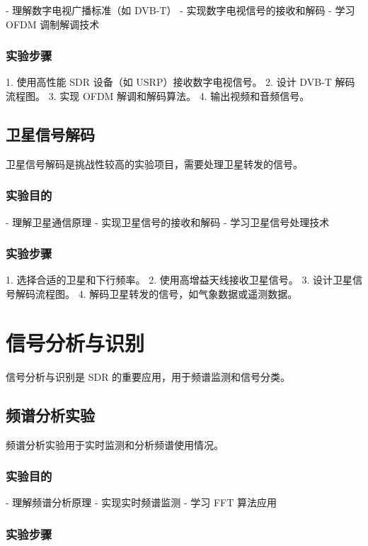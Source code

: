 \documentclass[UTF8]{ctexbook}
\begin{document}
- 理解数字电视广播标准（如 DVB-T）
- 实现数字电视信号的接收和解码
- 学习 OFDM 调制解调技术

\subsubsection{实验步骤}

1. 使用高性能 SDR 设备（如 USRP）接收数字电视信号。
2. 设计 DVB-T 解码流程图。
3. 实现 OFDM 解调和解码算法。
4. 输出视频和音频信号。

\subsection{卫星信号解码}

卫星信号解码是挑战性较高的实验项目，需要处理卫星转发的信号。

\subsubsection{实验目的}

- 理解卫星通信原理
- 实现卫星信号的接收和解码
- 学习卫星信号处理技术

\subsubsection{实验步骤}

1. 选择合适的卫星和下行频率。
2. 使用高增益天线接收卫星信号。
3. 设计卫星信号解码流程图。
4. 解码卫星转发的信号，如气象数据或遥测数据。

\section{信号分析与识别}

信号分析与识别是 SDR 的重要应用，用于频谱监测和信号分类。

\subsection{频谱分析实验}

频谱分析实验用于实时监测和分析频谱使用情况。

\subsubsection{实验目的}

- 理解频谱分析原理
- 实现实时频谱监测
- 学习 FFT 算法应用

\subsubsection{实验步骤}
\end{document}
